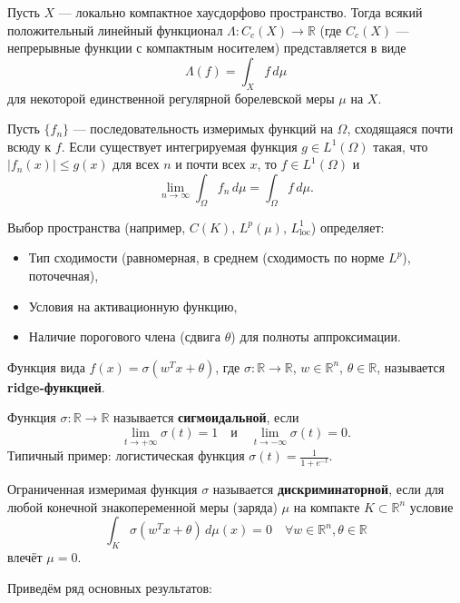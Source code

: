\documentclass[../NDCNNAI_main.tex]{subfiles}
\begin{document}
\begin{theorem}
Пусть \( X \) --- локально компактное хаусдорфово пространство. Тогда всякий положительный линейный функционал \( \Lambda\colon C_c(X) \to \mathbb{R} \) (где \( C_c(X) \) --- непрерывные функции с компактным носителем) представляется в виде
\[
\Lambda(f) = \int_X f \, d\mu
\]
для некоторой единственной регулярной борелевской меры \( \mu \) на \( X \).
\end{theorem}

\begin{theorem}
Пусть \( \{f_n\} \) --- последовательность измеримых функций на \( \Omega \), сходящаяся почти всюду к \( f \). Если существует интегрируемая функция \( g \in L^1(\Omega) \) такая, что \( |f_n(x)| \le g(x) \) для всех \( n \) и почти всех \( x \), то \( f \in L^1(\Omega) \) и
\[
\lim_{n\to\infty} \int_\Omega f_n \, d\mu = \int_\Omega f \, d\mu.
\]
\end{theorem}
Выбор пространства (например, \( C(K) \), \( L^p(\mu) \), \( L^1_{\text{loc}} \)) определяет:
\begin{itemize}
    \item Тип сходимости (равномерная, в среднем (сходимость по норме \( L^p \)), поточечная),
    \item Условия на активационную функцию,
    \item Наличие порогового члена (сдвига \( \theta \)) для полноты аппроксимации.
\end{itemize}

\begin{definition}
    Функция вида \( f(x) = \sigma(w^T x + \theta) \), где \( \sigma\colon \mathbb{R} \to \mathbb{R} \), \( w \in \mathbb{R}^n \), \( \theta \in \mathbb{R} \), называется \textbf{ridge-функцией}.
\end{definition}

\begin{definition}
    Функция \( \sigma\colon \mathbb{R} \to \mathbb{R} \) называется \textbf{сигмоидальной}, если
    \[
    \lim_{t \to +\infty} \sigma(t) = 1 \quad \text{и} \quad \lim_{t \to -\infty} \sigma(t) = 0.
    \]
    Типичный пример: логистическая функция \( \sigma(t) = \frac{1}{1+e^{-t}} \).
\end{definition}

\begin{definition}
    Ограниченная измеримая функция \( \sigma \) называется \textbf{дискриминаторной}, если для любой конечной знакопеременной меры (заряда) \( \mu \) на компакте \( K \subset \mathbb{R}^n \) условие
    \[
    \int_K \sigma(w^T x + \theta) \, d\mu(x) = 0 \quad \forall w \in \mathbb{R}^n, \theta \in \mathbb{R}
    \]
    влечёт \( \mu = 0 \).
\end{definition}
Приведём ряд основных результатов:
\end{document}

